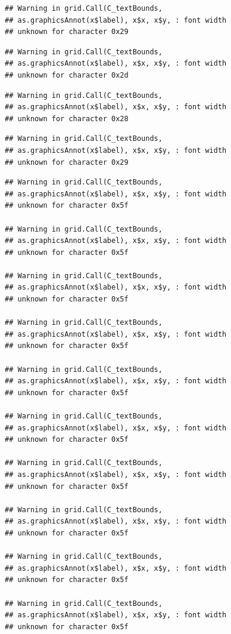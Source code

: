 \documentclass[
]{book}
\begin{document}
\begin{verbatim}
## Warning in grid.Call(C_textBounds,
## as.graphicsAnnot(x$label), x$x, x$y, : font width
## unknown for character 0x29
\end{verbatim}

\begin{verbatim}
## Warning in grid.Call(C_textBounds,
## as.graphicsAnnot(x$label), x$x, x$y, : font width
## unknown for character 0x2d
\end{verbatim}

\begin{verbatim}
## Warning in grid.Call(C_textBounds,
## as.graphicsAnnot(x$label), x$x, x$y, : font width
## unknown for character 0x28
\end{verbatim}

\begin{verbatim}
## Warning in grid.Call(C_textBounds,
## as.graphicsAnnot(x$label), x$x, x$y, : font width
## unknown for character 0x29
\end{verbatim}

\begin{verbatim}
## Warning in grid.Call(C_textBounds,
## as.graphicsAnnot(x$label), x$x, x$y, : font width
## unknown for character 0x5f

## Warning in grid.Call(C_textBounds,
## as.graphicsAnnot(x$label), x$x, x$y, : font width
## unknown for character 0x5f

## Warning in grid.Call(C_textBounds,
## as.graphicsAnnot(x$label), x$x, x$y, : font width
## unknown for character 0x5f

## Warning in grid.Call(C_textBounds,
## as.graphicsAnnot(x$label), x$x, x$y, : font width
## unknown for character 0x5f

## Warning in grid.Call(C_textBounds,
## as.graphicsAnnot(x$label), x$x, x$y, : font width
## unknown for character 0x5f

## Warning in grid.Call(C_textBounds,
## as.graphicsAnnot(x$label), x$x, x$y, : font width
## unknown for character 0x5f

## Warning in grid.Call(C_textBounds,
## as.graphicsAnnot(x$label), x$x, x$y, : font width
## unknown for character 0x5f

## Warning in grid.Call(C_textBounds,
## as.graphicsAnnot(x$label), x$x, x$y, : font width
## unknown for character 0x5f

## Warning in grid.Call(C_textBounds,
## as.graphicsAnnot(x$label), x$x, x$y, : font width
## unknown for character 0x5f

## Warning in grid.Call(C_textBounds,
## as.graphicsAnnot(x$label), x$x, x$y, : font width
## unknown for character 0x5f
\end{verbatim}
\end{document}
